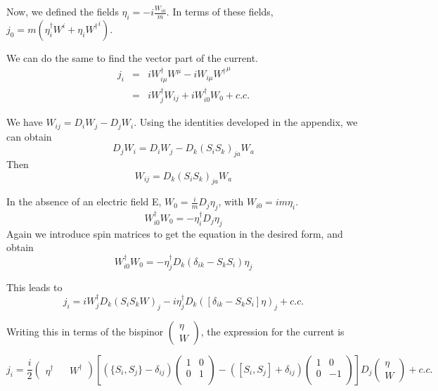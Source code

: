 Now, we defined the fields $\eta_i = -i \frac{W_{i0}}{m}$.  In terms of these fields,
$j_0 =  m (\eta_i^\dagger  W^i + \eta_i {W^\dagger}^i )$. 

We can do the same to find the vector part of the current.
\begin{eqnarray*}
	j_i &=& i W_{i \mu}^\dagger W^{\mu} - i W_{i \mu} {W^{\dagger}}^\mu 	\\
	&=&	i W_j^\dagger W_{ij}  + i W_{i0}^\dagger W_0 + c.c.
\end{eqnarray*}

We have $W_{ij} = D_i W_j - D_j W_i$.  Using the identities developed in the appendix, we can obtain
\[ D_j W_i = D_i W_j - D_k(S_i S_k)_{ja} W_a 	\]
Then
\[ W_{ij} = D_k (S_i S_k)_{ja} W_a 	\]

In the absence of an electric field E, $W_{0} = \frac{i}{m} D_j \eta_j$, with $W_{i0} = i m \eta_i$.
\[	W_{i0}^\dagger W_0 = - \eta_i^\dagger D_j \eta_j 	\]
Again we introduce spin matrices to get the equation in the desired form, and obtain
\[	W_{i0}^\dagger W_0 = - \eta_j^\dagger D_k (\delta_{ik} - S_k S_i) \eta_j 	\]

This leads to
\[ j_i = i W_j^\dagger D_k (S_i S_k W)_j - i \eta_j^\dagger D_k ([\delta_{ik} - S_k S_i]\eta)_j + c.c. \]

Writing this in terms of the bispinor $\begin{pmatrix}\eta \\ W\end{pmatrix}$, the expression for the current is

\begin{equation}	j_i	=
		\frac{i}{2} \begin{pmatrix}\eta^\dagger && W^\dagger \end{pmatrix} \left [
		(\{S_i, S_j\} - \delta_{ij})  
		\begin{pmatrix} 
			1 & 0 \\
			0 & 1 \\ 
		\end{pmatrix}
		- ([S_i, S_j] +\delta_{ij})	\begin{pmatrix} 1 & 0 \\ 0 & -1 \\ \end{pmatrix}
		\right ]
		D_j \begin{pmatrix}\eta \\ W\end{pmatrix} + c.c.
\end{equation}



